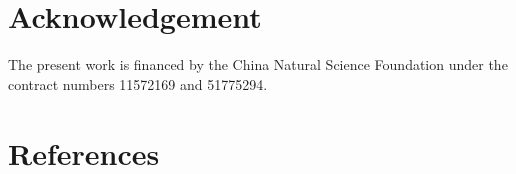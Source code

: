 \documentclass[preprint,5p,twocolumn,11pt,sort&compress]{elsarticle}
\begin{document}

\section*{Acknowledgement}
The present work is financed by the China Natural Science Foundation under the contract numbers 11572169 and 51775294.

\section*{References}


\end{document}
